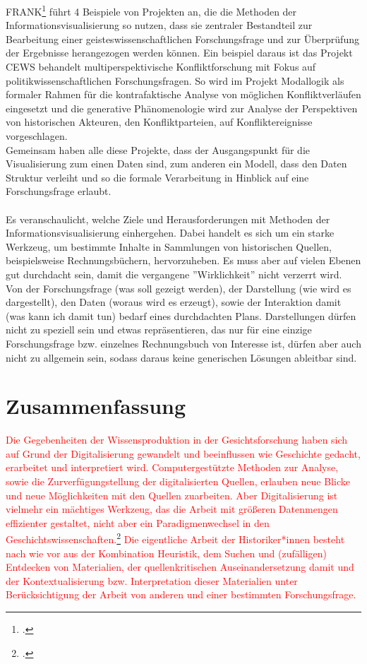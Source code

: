 \documentclass[12pt,a4paper]{article}
\begin{document}
FRANK\footcite{frank2018visualisierungswerkzeuge} führt 4 Beispiele von Projekten an, die die Methoden der Informationsvisualisierung so nutzen, dass sie zentraler Bestandteil zur Bearbeitung einer geisteswissenschaftlichen Forschungsfrage und zur Überprüfung der Ergebnisse herangezogen werden können. Ein beispiel daraus ist das Projekt CEWS behandelt multiperspektivische Konfliktforschung mit Fokus auf politikwissenschaftlichen Forschungsfragen. So wird im Projekt Modallogik als formaler Rahmen für die kontrafaktische Analyse von möglichen Konfliktverläufen eingesetzt und die generative Phänomenologie wird zur Analyse der Perspektiven von historischen Akteuren, den Konfliktparteien, auf Konfliktereignisse vorgeschlagen.
\\
Gemeinsam haben alle diese Projekte, dass der Ausgangspunkt für die Visualisierung zum einen Daten sind, zum anderen ein Modell, dass den Daten Struktur verleiht und so die formale Verarbeitung in Hinblick auf eine Forschungsfrage erlaubt.
\\
\\
Es veranschaulicht, welche Ziele und Herausforderungen mit Methoden der Informationsvisualisierung einhergehen. Dabei handelt es sich um ein starke Werkzeug, um bestimmte Inhalte in Sammlungen von historischen Quellen, beispielsweise Rechnungsbüchern, hervorzuheben. Es muss aber auf vielen Ebenen gut durchdacht sein, damit die vergangene ''Wirklichkeit'' nicht verzerrt wird. Von der Forschungsfrage (was soll gezeigt werden), der Darstellung (wie wird es dargestellt), den Daten (woraus wird es erzeugt), sowie der Interaktion damit (was kann ich damit tun) bedarf eines durchdachten Plans. Darstellungen dürfen nicht zu speziell sein und etwas repräsentieren, das nur für eine einzige Forschungsfrage bzw. einzelnes Rechnungsbuch von Interesse ist, dürfen aber auch nicht zu allgemein sein, sodass daraus keine generischen Lösungen ableitbar sind.


\newpage
\section{Zusammenfassung}

\textcolor{red}{
Die Gegebenheiten der Wissensproduktion in der Gesichtsforschung haben sich auf Grund der Digitalisierung gewandelt und beeinflussen wie Geschichte gedacht, erarbeitet und interpretiert wird. Computergestützte Methoden zur Analyse, sowie die Zurverfügungstellung der digitalisierten Quellen, erlauben neue Blicke und neue Möglichkeiten mit den Quellen zuarbeiten. Aber Digitalisierung ist vielmehr ein mächtiges Werkzeug, das die Arbeit mit größeren Datenmengen effizienter gestaltet, nicht aber ein Paradigmenwechsel in den Geschichtswissenschaften.\footcite[][]{koenig2020archive} Die eigentliche Arbeit der Historiker*innen besteht nach wie vor aus der Kombination Heuristik, dem Suchen und (zufälligen) Entdecken von Materialien, der quellenkritischen Auseinandersetzung damit und der Kontextualisierung bzw. Interpretation dieser Materialien unter Berücksichtigung der Arbeit von anderen und einer bestimmten Forschungsfrage. 
}



\newpage


\newpage
\listoffigures
\end{document}
